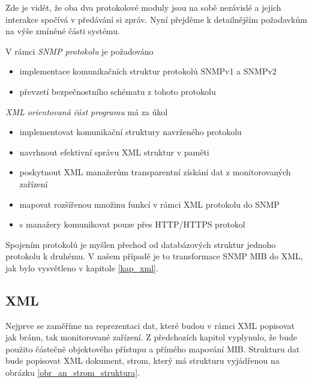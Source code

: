 Zde je vidět, že oba dva protokolové moduly jsou na sobě nezávislé a jejich interakce spočívá v předávání si zpráv. Nyní přejděme k detailnějším požadavkům na výše zmíněné části systému.

V rámci \textit{SNMP protokolu} je požadováno
\begin{itemize}
	\item implementace komunikačních struktur protokolů SNMPv1 a SNMPv2
	\item převzetí bezpečnostního schématu z tohoto protokolu
\end{itemize}

\textit{XML orientovaná část programu } má za úkol
\begin{itemize}
	\item implementovat komunikační struktury navrženého protokolu
	\item navrhnout efektivní správu XML struktur v paměti
	\item poskytnout XML manažerům transparentní získání dat z monitorovaných zařízení
	\item mapovat rozšířenou množinu funkcí v rámci XML protokolu do SNMP
	\item s manažery komunikovat pouze přes HTTP/HTTPS protokol
\end{itemize}
Spojením protokolů je myšlen přechod od databázových struktur jednoho protokolu k druhému. V našem případě je to transformace SNMP MIB do XML, jak bylo vysvětleno v kapitole \ref{kap_xml}.

\subsection{XML}
Nejprve se zaměříme na reprezentaci dat, které budou v rámci XML popisovat jak bránu, tak monitorované zařízení. Z předchozích kapitol vyplynulo, že bude použito částečně objektového přístupu a přímého mapování MIB.
Strukturu dat bude popisovat XML dokument, strom, který má strukturu vyjádřenou na obrázku \ref{obr_an_strom_struktura}.

